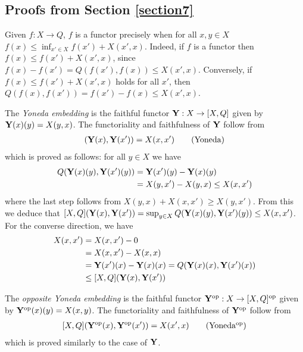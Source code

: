 %
\subsection{Proofs from Section \ref{section7}}

\begin{remark}\label{rem:functor}
Given $f:X\to Q$, $f$ is a functor precisely when for all $x,y\in X$ $f(x)\leq\inf_{x'\in X}f(x')+X(x',x)$. 
Indeed, if $f$ is a functor then $f(x)\leq f(x')+X(x',x)$, since $f(x)-f(x')=Q(f(x'),f(x))\leq X(x',x)$. 
Conversely, if $f(x)\leq f(x')+X(x',x)$ holds for all $x'$, then 
$Q(f(x),f(x'))=f(x')-f(x)\leq X(x',x)$. 
\end{remark}



\begin{remark}


The \emph{Yoneda embedding} is the faithful functor $\mathbf{Y}: X\to [X,Q]$ given by $\mathbf{Y}(x)(y)=X(y,x)$. The functoriality and faithfulness of $\mathbf{Y}$ follow from
\begin{align}
[X,Q](\B Y(x),\B Y(x'))= X(x,x') \tag{Yoneda}
\end{align}
which is proved as follows: for all $y\in X$ we have 
\begin{align*}
Q( \mathbf{Y}(x)(y),\mathbf{Y}(x')(y))&= \mathbf{Y}(x')(y)-\mathbf{Y}(x)(y) \\
&= X(y,x')-X(y,x) \leq X(x,x')
\end{align*}
where the last step follows from $X(y,x)+X(x,x')\geq X(y,x')$. 
From this we deduce that $[X,Q](\mathbf{Y}(x),\mathbf{Y}(x'))=\sup_{y\in X}Q( \mathbf{Y}(x)(y),\mathbf{Y}(x')(y))\leq X(x,x')$. 
For the converse direction, we have  
\begin{align*}
X(x,x') &  = X(x,x') - 0 \\ &=
X(x,x')- X(x,x)
\\& =\mathbf{Y}(x')(x)-\mathbf{Y}(x)(x)= Q(\mathbf{Y}(x)(x),\mathbf{Y}(x')(x))\\
&\leq [X,Q](\mathbf{Y}(x), \mathbf{Y}(x'))
\end{align*}
\end{remark}


\begin{remark}
The \emph{opposite Yoneda embedding} is the faithful functor
$\mathbf{Y}^{\mathrm{op}}: X\to [X,Q]^{\mathrm{op}}$ given by $\mathbf{Y}^{\mathrm{op}}(x)(y)=X(x,y)$. The functoriality and faithfulness of $\mathbf{Y}^{\mathrm{op}}$ follow from
\begin{align}\label{eq:yonedaop}
[X,Q](\B Y^{\mathrm{op}}(x),\B Y^{\mathrm{op}}(x'))= X(x',x) \tag{Yoneda$^{\mathrm{op}}$}
\end{align}
which is proved similarly to the case of $\mathbf{Y}$.
\end{remark}

